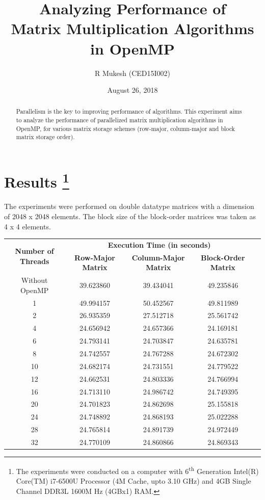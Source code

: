 \documentclass{article}
\title{Analyzing Performance of \\Matrix Multiplication Algorithms in OpenMP}
\author{R Mukesh (CED15I002)}
\affil{IIITDM Kancheepuram}
\date{August 26, 2018}
\begin{document}
\maketitle

\begin{abstract}
	Parallelism is the key to improving performance of algorithms. This experiment aims to analyze the performance of parallelized matrix multiplication algorithms in OpenMP, for various matrix storage schemes (row-major, column-major and block matrix storage order).
\end{abstract}

\section{Results \protect\footnote{The experiments were conducted on a computer with 6\textsuperscript{th} Generation Intel(R) Core(TM) i7-6500U Processor (4M Cache, upto 3.10 GHz) and 4GB Single Channel DDR3L 1600M Hz (4GBx1) RAM.}}

The experiments were performed on double datatype matrices with a dimension of 2048 x 2048 elements. The block size of the block-order matrices was taken as 4 x 4 elements.

\begin{table}[!htbp]
\begin{tabular}{|c|c|c|c|l}
\cline{1-4}
\multirow{2}{*}{\textbf{Number of Threads}} & \multicolumn{3}{c|}{\textbf{Execution Time (in seconds)}} &  \\ \cline{2-4}
 & \textbf{Row-Major Matrix} & \textbf{Column-Major Matrix} & \textbf{Block-Order Matrix} &  \\ \cline{1-4}
Without OpenMP & 39.623860 & 39.434041 & 49.235846 &  \\ \cline{1-4}
1 & 49.994157 & 50.452567 & 49.811989 &  \\ \cline{1-4}
2 & 26.935359 & 27.512718 & 25.561742 &  \\ \cline{1-4}
4 & 24.656942 & 24.657366 & 24.169181 &  \\ \cline{1-4}
6 & 24.793141 & 24.703847 & 24.635781 &  \\ \cline{1-4}
8 & 24.742557 & 24.767288 & 24.672302 &  \\ \cline{1-4}
10 & 24.682174 & 24.731551 & 24.779522 &  \\ \cline{1-4}
12 & 24.662531 & 24.803336 & 24.766994 &  \\ \cline{1-4}
16 & 24.713110 & 24.986742 & 24.749395 &  \\ \cline{1-4}
20 & 24.701823 & 24.862698 & 25.155818 &  \\ \cline{1-4}
24 & 24.748892 & 24.868193 & 25.022288 &  \\ \cline{1-4}
28 & 24.765814 & 24.891739 & 24.972449 &  \\ \cline{1-4}
32 & 24.770109 & 24.860866 & 24.869343 &  \\ \cline{1-4}
\end{tabular}
\end{table}
\end{document}

